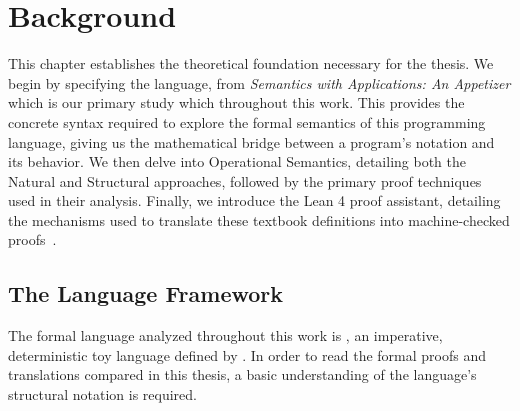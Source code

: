 %
%
%
%
%
%
\chapter{Background}
\label{cha:background}
\noindent
This chapter establishes the theoretical foundation necessary for the thesis.
We begin by specifying the \While language, from \emph{Semantics with Applications: An Appetizer}
which is our primary study which throughout this work. This provides the concrete syntax required to
explore the formal semantics of this programming language, giving us the mathematical bridge
between a program's notation and its behavior. We then delve into Operational
Semantics, detailing both the Natural and Structural
approaches, followed by the primary proof techniques used in their analysis.
Finally, we introduce the Lean 4 proof assistant, detailing the mechanisms used
to translate these textbook definitions into machine-checked proofs~\citep{theorem_proving_2026}.

%
%
%
\section{The \While Language Framework}
\label{background:sec:while}
The formal language analyzed throughout this work is \While, an imperative,
deterministic toy language defined by \citet{nielson_semantics_2007}.
In order to read the formal proofs and translations compared in this thesis, a basic understanding of the language's structural notation is required.

